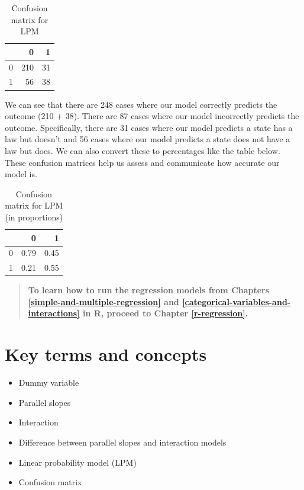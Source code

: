 \documentclass[
]{book}
\providecommand{\tightlist}{%
  \setlength{\itemsep}{0pt}\setlength{\parskip}{0pt}}
\begin{document}
\begin{table}

\caption{\label{tab:confumat}Confusion matrix for LPM}
\centering
\begin{tabular}[t]{l|r|r}
\hline
  & 0 & 1\\
\hline
0 & 210 & 31\\
\hline
1 & 56 & 38\\
\hline
\end{tabular}
\end{table}

We can see that there are 248 cases where our model correctly predicts the outcome (210 + 38). There are 87 cases where our model incorrectly predicts the outcome. Specifically, there are 31 cases where our model predicts a state has a law but doesn't and 56 cases where our model predicts a state does not have a law but does. We can also convert these to percentages like the table below. These confusion matrices help us assess and communicate how accurate our model is.

\begin{table}

\caption{\label{tab:unnamed-chunk-35}Confusion matrix for LPM (in proportions)}
\centering
\begin{tabular}[t]{l|r|r}
\hline
  & 0 & 1\\
\hline
0 & 0.79 & 0.45\\
\hline
1 & 0.21 & 0.55\\
\hline
\end{tabular}
\end{table}

\begin{quote}
\textbf{To learn how to run the regression models from Chapters \ref{simple-and-multiple-regression} and \ref{categorical-variables-and-interactions} in R, proceed to Chapter \ref{r-regression}.}
\end{quote}

\hypertarget{kt7}{%
\section{Key terms and concepts}\label{kt7}}

\begin{itemize}
\tightlist
\item
  Dummy variable
\item
  Parallel slopes
\item
  Interaction
\item
  Difference between parallel slopes and interaction models
\item
  Linear probability model (LPM)
\item
  Confusion matrix
\end{itemize}
\end{document}
